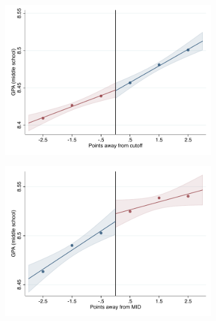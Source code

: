 \documentclass[oneside,11pt]{article}
\begin{document}
\begin{figure}[H]

    \ContinuedFloat
    \caption{(Continued) RD plots for balance variables across those assigned to UNAM high-school, and those who are not\label{fig:Balance_rd_plot_UNAM_2}}
    \begin{center}
    
    \begin{subfigure}{0.475\textwidth}
        \centering
        \includegraphics[width=\textwidth]{04_Figures/rd_plot_tau_sus_prom_UNAM3.pdf}
    \end{subfigure}
    \begin{subfigure}{0.475\textwidth}
        \centering
        \includegraphics[width=\textwidth]{04_Figures/rd_plot_mid_sus_prom_UNAM3.pdf}
    \end{subfigure}


\end{center}
\end{figure}
\end{document}
